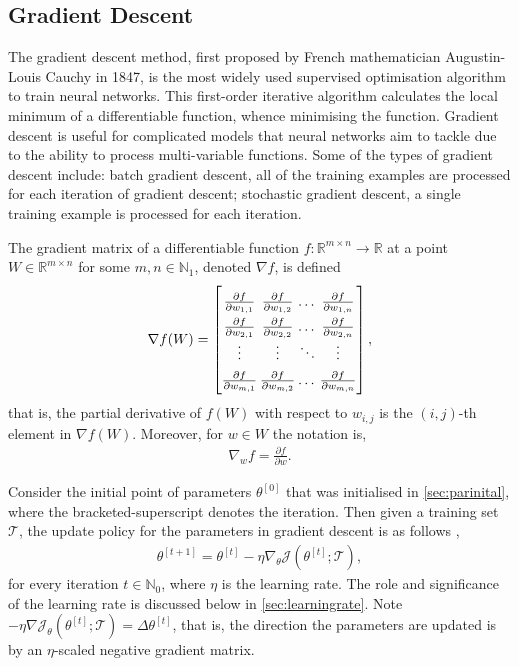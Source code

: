 \subsection{Gradient Descent}\label{sec:gradientdescent}
The gradient descent method, first proposed by French mathematician Augustin-Louis Cauchy in 1847, is the most widely used supervised optimisation algorithm to train neural networks. This first-order iterative algorithm calculates the local minimum of a differentiable function, whence minimising the function. Gradient descent is useful for complicated models that neural networks aim to tackle due to the ability to process multi-variable functions. Some of the types of gradient descent include: batch gradient descent, all of the training examples are processed for each iteration of gradient descent; stochastic gradient descent, a single training example is processed for each iteration. 

\begin{defn} The gradient matrix of a differentiable function $f:\mathbb{R}^{m\times n}\rightarrow \mathbb{R}$ at a point $W\in\mathbb{R}^{m\times n}$ for some $m,n\in\mathbb{N}_1$, denoted $\nabla f$, is defined
\begin{equation}
    \nabla f(W)=
    \arraycolsep=1pt\def\arraystretch{1.5}
    \begin{bmatrix}
            \frac{\partial f}{\partial w_{1,1}} &  \frac{\partial f}{\partial w_{1,2}} & \dots & \frac{\partial f}{\partial w_{1,n}} \\
            \frac{\partial f}{\partial w_{2,1}} &  \frac{\partial f}{\partial w_{2,2}} & \dots & \frac{\partial f}{\partial w_{2,n}} \\
            \vdots & \vdots & \ddots & \vdots \\
            \frac{\partial f}{\partial w_{m,1}} &  \frac{\partial f}{\partial w_{m,2}} & \dots & \frac{\partial f}{\partial w_{m,n}}
        \end{bmatrix},
\end{equation}
    that is, the partial derivative of $f(W)$ with respect to $w_{i,j}$ is the $(i,j)$-th element in $\nabla f(W)$. Moreover, for $w\in W$ the notation is,
\begin{align*}
    \nabla_w f=\frac{\partial f}{\partial w}.
\end{align*}
\end{defn}
Consider the initial point of parameters $\theta^{[0]}$ that was initialised in \autoref{sec:parinital},  where the bracketed-superscript denotes the iteration. Then given a training set $\mathcal{T}$, the update policy for the parameters in gradient descent is as follows \parencite{Zhanggradient},
\begin{align}
    \theta^{[t+1]}=\theta^{[t]}-\eta \nabla_\theta \mathcal{J}(\theta^{[t]};\mathcal{T}), \label{eq:iteration}
\end{align}
 for every iteration $t\in\mathbb{N}_0$, where $\eta$ is the learning rate. The role and significance of the learning rate is discussed below in \autoref{sec:learningrate}. Note  $-\eta \nabla \mathcal{J}_\theta( \theta^{[t]};\mathcal{T}) = \Delta \theta^{[t]}$, that is, the direction the parameters are updated is by an $\eta$-scaled negative gradient matrix. 

